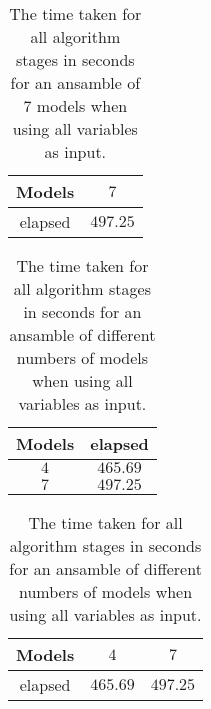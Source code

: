 \begin{table}[!ht]
	\centering
	\begin{tabular}{|c|c|}
		\hline
		Models & $7$ \\ \hline
		elapsed & $497.25$ \\ \hline
	\end{tabular}
	\caption{The time taken for all algorithm stages in seconds for an ansamble of 7 models when using all variables as input.}
	\label{tab:time:ansamble:reverse:all:7}
\end{table}

\begin{table}[!ht]
	\centering
	\begin{tabular}{|c|c|}
		\hline
		Models & elapsed \\ \hline
		$4$ & $465.69$ \\ \hline
		$7$ & $497.25$ \\ \hline
	\end{tabular}
	\caption{The time taken for all algorithm stages in seconds for an ansamble of different numbers of models when using all variables as input.}
	\label{tab:time:ansamble:all}
\end{table}

\begin{table}[!ht]
	\centering
	\begin{tabular}{|c|c|c|}
		\hline
		Models & $4$ & $7$ \\ \hline
		elapsed & $465.69$ & $497.25$ \\ \hline
	\end{tabular}
	\caption{The time taken for all algorithm stages in seconds for an ansamble of different numbers of models when using all variables as input.}
	\label{tab:time:ansamble:reverse:all}
\end{table}
